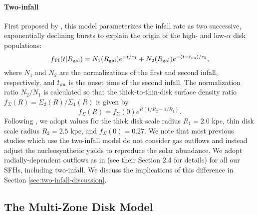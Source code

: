 \documentclass[twocolumn,twocolappendix,linenumbers,trackchanges]{aastex631}
\begin{document}
\paragraph{Two-infall} First proposed by \citet{Chiappini1997-TwoInfall}, this model parameterizes the infall rate as two successive, exponentially declining bursts to explain the origin of the high- and low-$\alpha$ disk populations:
\begin{equation}
    \label{eq:twoinfall-ifr}
    f_{\rm TI}(t|R_{\rm gal}) = N_1(R_{\rm gal}) e^{-t/\tau_1} + N_2(R_{\rm gal}) e^{-(t-t_{\rm on})/\tau_2},
\end{equation}
where $N_1$ and $N_2$ are the normalizations of the first and second infall, respectively, and $t_{\rm on}$ is the onset time of the second infall.
The normalization ratio $N_2/N_1$ is calculated so that the thick-to-thin-disk surface density ratio $f_\Sigma(R)=\Sigma_2(R)/\Sigma_1(R)$ is given by
\begin{equation}
    f_\Sigma(R) = f_\Sigma(0) e^{R(1/R_2 - 1/R_1)}.
\end{equation}
Following \citet{BlandHawthornGerhard2016-MilkyWayReview}, we adopt values for the thick disk scale radius $R_1=2.0$ kpc, thin disk scale radius $R_2=2.5$ kpc, and $f_\Sigma(0)=0.27$.
We note that most previous studies which use the two-infall model \citep[e.g.,][]{Spitoni2021-TwoInfall} do not consider gas outflows and instead adjust the nucleosynthetic yields to reproduce the solar abundance. We adopt radially-dependent outflows as in  (see their Section 2.4 for details) for all our SFHs, including two-infall. We discuss the implications of this difference in Section \ref{sec:two-infall-discussion}.

\subsection{The Multi-Zone Disk Model}
\label{sec:multizone-methods}
\end{document}
